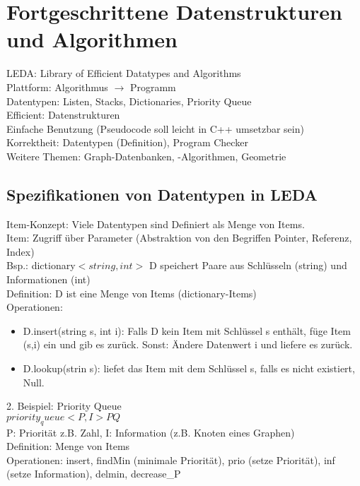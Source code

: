 \documentclass[a4paper]{article}
\begin{document}
\section*{Fortgeschrittene Datenstrukturen und Algorithmen}
LEDA: Library of Efficient Datatypes and Algorithms\\
Plattform: Algorithmus $\rightarrow$ Programm\\
Datentypen:  Listen, Stacks, Dictionaries, Priority Queue\\
Efficient: Datenstrukturen\\
Einfache Benutzung (Pseudocode soll leicht in C++ umsetzbar sein)\\
Korrektheit: Datentypen (Definition), Program Checker\\
Weitere Themen: Graph-Datenbanken, -Algorithmen, Geometrie\\
\subsection*{Spezifikationen von Datentypen in LEDA}
Item-Konzept: Viele Datentypen sind Definiert als Menge von Items.\\
Item: Zugriff über Parameter (Abstraktion von den Begriffen Pointer, Referenz, Index)\\
Bsp.: dictionary$<string, int>$ D speichert Paare aus Schlüsseln (string) und Informationen (int)\\
Definition: D ist eine Menge von Items (dictionary-Items)\\
Operationen: \\
\begin{itemize}
\item D.insert(string s, int i): Falls D kein Item mit Schlüssel s enthält, füge Item (s,i) ein und gib es zurück. Sonst: Ändere Datenwert i und liefere es zurück.
\item D.lookup(strin s): liefet das Item mit dem Schlüssel s, falls es nicht existiert, Null.
\end{itemize}
2. Beispiel: Priority Queue\\
$priority_queue<P,I> PQ$\\
P: Priorität z.B. Zahl, I: Information (z.B. Knoten eines Graphen)\\
Definition: Menge von Items\\
Operationen: insert, findMin (minimale Priorität), prio (setze Priorität), inf (setze Information), delmin, decrease\_P\\
\end{document}
